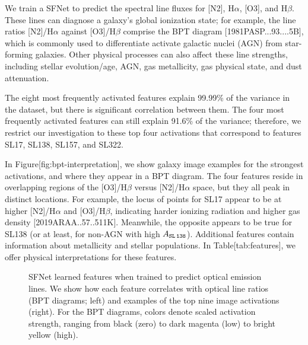 \documentclass[11pt,a4paper]{article}
\begin{document}
We train a SFNet to predict the spectral line fluxes for [N2], H$\alpha$, [O3], and H$\beta$. These lines can diagnose a galaxy's global ionization state; for example, the line ratios [N2]/H$\alpha$ against [O3]/H$\beta$ comprise the BPT diagram [1981PASP...93....5B], which is commonly used to differentiate activate galactic nuclei (AGN) from star-forming galaxies. Other physical processes can also affect these line strengths, including stellar evolution/age, AGN, gas metallicity, gas physical state, and dust attenuation.

The eight most frequently activated features explain 99.99\% of the variance in the dataset, but there is significant correlation between them. The four most frequently activated features can still explain 91.6\% of the variance; therefore, we restrict our investigation to these top four activations that correspond to features SL17, SL138, SL157, and SL322.

In Figure[fig:bpt-interpretation], we show galaxy image examples for the strongest activations, and where they appear in a BPT diagram. The four features reside in overlapping regions of the [O3]/H$\beta$ versus [N2]/H$\alpha$ space, but they all peak in distinct locations. For example, the locus of points for SL17 appear to be at higher [N2]/H$\alpha$ and [O3]/H$\beta$, indicating harder ionizing radiation and higher gas density [2019ARAA..57..511K]. Meanwhile, the opposite appears to be true for SL138 (or at least, for non-AGN with high $A_{\tt SL\,138}$). Additional features contain information about metallicity and stellar populations. In Table[tab:features], we offer physical interpretations for these features.

\begin{figure}[h]
\caption{SFNet learned features when trained to predict optical emission lines. We show how each feature correlates with optical line ratios (BPT diagrams; left) and examples of the top nine image activations (right). For the BPT diagrams, colors denote scaled activation strength, ranging from black (zero) to dark magenta (low) to bright yellow (high).}
\end{figure}

\begin{figure}[h]
\end{figure}

\begin{figure}[h]
\end{figure}

\begin{figure}[h]
\end{figure}
\end{document}
